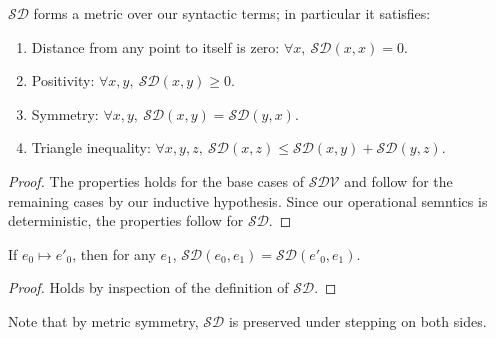 \begin{lemma}
  $\mathcal{SD}$ forms a metric over our syntactic terms; in particular it
  satisfies:
  \begin{enumerate}
    \item Distance from any point to itself is zero: $\forall x,~\mathcal{SD}(x,
      x) = 0$.
    \item Positivity: $\forall x, y,~\mathcal{SD}(x, y) \geq 0$.
    \item Symmetry: $\forall x, y,~\mathcal{SD}(x, y) = \mathcal{SD}(y, x)$.
    \item Triangle inequality: $\forall x, y, z,~\mathcal{SD}(x, z) \leq
      \mathcal{SD}(x, y) + \mathcal{SD}(y, z)$.
  \end{enumerate}
\end{lemma}
\begin{proof}
  The properties holds for the base cases of $\mathcal{SDV}$ and follow for the
  remaining cases by our inductive hypothesis. Since our operational semntics is
  deterministic, the properties follow for $\mathcal{SD}$.
\end{proof}

\begin{lemma}
  If $e_0 \mapsto e'_0$, then for any $e_1$, $\mathcal{SD}(e_0, e_1) =
  \mathcal{SD}(e'_0, e_1)$.
\end{lemma}
\begin{proof}
  Holds by inspection of the definition of $\mathcal{SD}$.
\end{proof}
Note that by metric symmetry, $\mathcal{SD}$ is preserved under stepping on both
sides.


